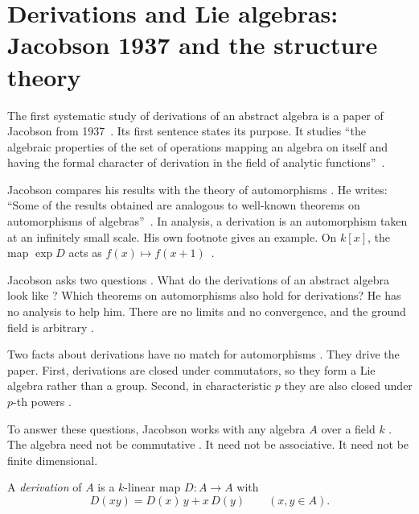 \section[Derivations and Lie algebras: Jacobson 1937 and the structure theory][Derivations and Lie algebras]{Derivations and Lie algebras: Jacobson 1937 and the structure theory}\label{sec:origins:lie-theory}

The first systematic study of derivations of an abstract algebra is a paper
of Jacobson from 1937~\cite{Jacobson1937}. Its first sentence states its
purpose. It studies ``the algebraic properties of the set of operations
mapping an algebra on itself and having the formal character of derivation
in the field of analytic functions''~\cite[p.~206]{Jacobson1937}.

Jacobson compares his results with the theory of automorphisms
\cite[p.~206]{Jacobson1937}. He writes: ``Some of the results obtained are
analogous to well-known theorems on automorphisms of
algebras''~\cite[p.~206]{Jacobson1937}. In analysis, a derivation is an
automorphism taken at an infinitely small scale. His own footnote gives an
example. On $k[x]$, the map $\exp D$ acts as $f(x) \mapsto
f(x+1)$~\cite[p.~206]{Jacobson1937}. %

Jacobson asks two questions \cite[p.~206]{Jacobson1937}. What do the
derivations of an abstract algebra look like \cite[p.~206]{Jacobson1937}?
Which theorems on automorphisms also hold for derivations? He has no analysis
to help him. There are no limits and no convergence, and the ground field is
arbitrary \cite[p.~206]{Jacobson1937}.

Two facts about derivations have no match for automorphisms
\cite[p.~207]{Jacobson1937}. They drive the
paper. First, derivations are closed under commutators, so they form a Lie
algebra rather than a group. Second, in characteristic $p$ they are also
closed under $p$-th powers \cite[p.~207]{Jacobson1937}.

To answer these questions, Jacobson works with any algebra $A$ over a field
$k$ \cite[p.~206]{Jacobson1937}. The algebra need not be commutative
\cite[p.~206]{Jacobson1937}. It need not be associative. It need not be
finite dimensional.

\begin{definition}\label{def:origins:jacobson}
A \emph{derivation} of $A$ is a $k$-linear map $D\colon A \to A$ with
\[
D(xy) = D(x)\,y + x\,D(y) \qquad (x, y \in A).
\]
\end{definition}

